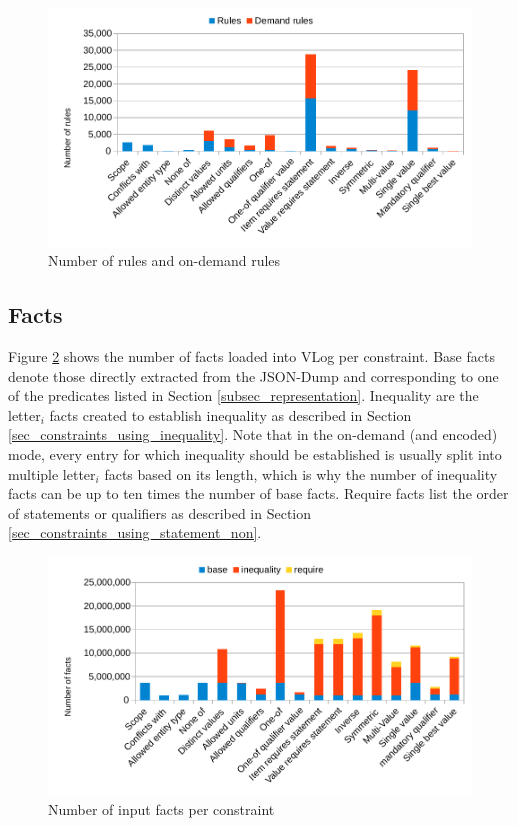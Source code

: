 \documentclass[hyperref,bachelorofscience,fleqn]{cgvpub}
\begin{document}
\begin{figure}
\includegraphics[width=\linewidth]{images/rules.pdf}
\caption{Number of rules and on-demand rules}\label{fig_rules}
\end{figure}

\subsection{Facts}
Figure \ref{fig_facts} shows the number of facts loaded into VLog per constraint. Base facts denote those directly extracted from the JSON-Dump and corresponding to one of the predicates listed in Section \ref{subsec_representation}. Inequality are the letter\(_i\) facts created to establish inequality as described in Section \ref{sec_constraints_using_inequality}. Note that in the on-demand (and encoded) mode, every entry for which inequality should be established is usually split into multiple letter\(_i\) facts based on its length, which is why the number of inequality facts can be up to ten times the number of base facts. Require facts list the order of statements or qualifiers as described in Section \ref{sec_constraints_using_statement_non}.

\begin{figure}
\includegraphics[width=\linewidth]{images/facts100,000.pdf}
\caption{Number of input facts per constraint}\label{fig_facts}
\end{figure}
\end{document}
